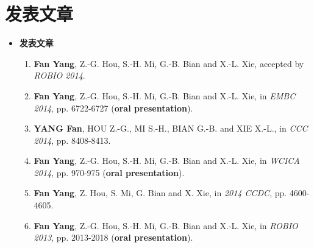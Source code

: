 \section{发表文章}

\begin{frame}

\begin{itemize}
\item \textbf{发表文章}
\begin{enumerate}
\item \textbf{Fan Yang}, Z.-G. Hou, S.-H. Mi, G.-B. Bian and X.-L. Xie, accepted by \textit{ROBIO 2014}.%
\item \textbf{Fan Yang}, Z.-G. Hou, S.-H. Mi, G.-B. Bian and X.-L. Xie, in \textit{EMBC 2014}, pp. 6722-6727 (\textbf{oral presentation}).%
\item \textbf{YANG Fan}, HOU Z.-G., MI S.-H., BIAN G.-B. and XIE X.-L., in \textit{CCC 2014}, pp. 8408-8413.%
\item \textbf{Fan Yang}, Z.-G. Hou, S.-H. Mi, G.-B. Bian and X.-L. Xie, in \textit{WCICA 2014}, pp. 970-975 (\textbf{oral presentation}).%
\item \textbf{Fan Yang}, Z. Hou, S. Mi, G. Bian and X. Xie, in \textit{2014 CCDC}, pp. 4600-4605.%
\item \textbf{Fan Yang}, Z.-G. Hou, S.-H. Mi, G.-B. Bian and X.-L. Xie, in \textit{ROBIO 2013}, pp. 2013-2018 (\textbf{oral presentation}).%
\end{enumerate}
\end{itemize}

\end{frame}
